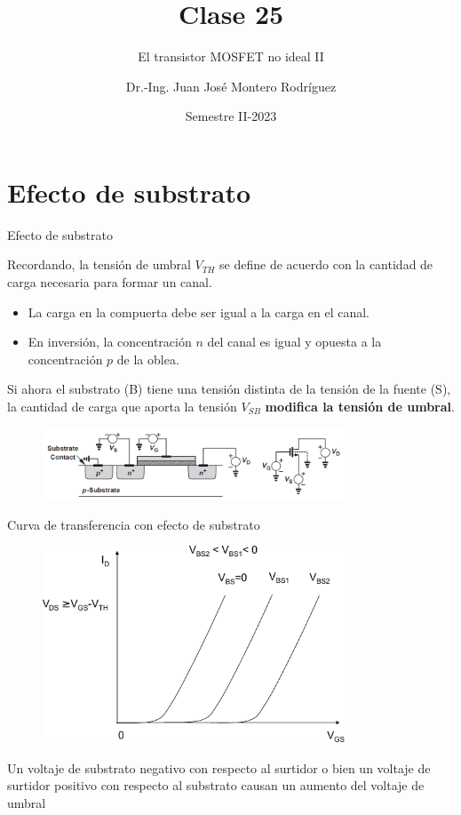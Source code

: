 \documentclass[t,aspectratio=169]{beamer}
\title{Clase 25}
\subtitle{El transistor MOSFET no ideal II}
\author{Dr.-Ing. Juan José Montero Rodríguez}
\institute{Escuela de Ingeniería Electrónica}
\date{Semestre II-2023}
\begin{document}
\begin{frame}{}
\maketitle
\end{frame}


\section{Efecto de substrato}
\begin{frame}{Efecto de substrato}

Recordando, la tensión de umbral $V_{TH}$ se define de acuerdo con la cantidad de carga necesaria para formar un canal.

\begin{itemize}
    \item La carga en la compuerta debe ser igual a la carga en el canal.
    \item En inversión, la concentración $n$ del canal es igual y opuesta a la concentración $p$ de la oblea.
\end{itemize}

\vspace{5mm}
Si ahora el substrato (B) tiene una tensión distinta de la tensión de la fuente (S), la cantidad de carga que aporta la tensión $V_{SB}$ \textbf{modifica la tensión de umbral}.

\begin{figure}[H]
    \centering
    \includegraphics[width=0.8\textwidth]{figuras/body_effect.png}
\end{figure}

\end{frame}


\begin{frame}{Curva de transferencia con efecto de substrato}
\centering

\begin{figure}[H]
    \centering
    \includegraphics[width=9cm]{figuras/theffect.pdf}
\end{figure}

Un voltaje de substrato negativo con respecto al surtidor o bien un voltaje de surtidor positivo con respecto al substrato causan un aumento del voltaje de umbral
\end{frame}
\end{document}
